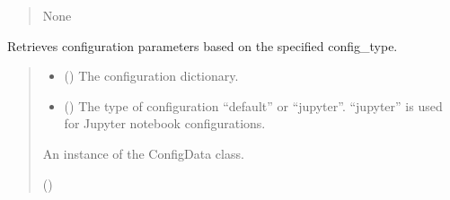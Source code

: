 \documentclass[a4paper,11pt,english,openany]{sphinxmanual}
\begin{document}
\begin{fulllineitems}
\begin{fulllineitems}
\begin{quote}
\begin{description}
\sphinxAtStartPar
None

\end{description}\end{quote}

\end{fulllineitems}


\begin{fulllineitems}
\label{\detokenize{api/spyice.utils.config_sort:id3}}
\pysigstartsignatures
{}
\pysigstopsignatures
\sphinxAtStartPar
Retrieves configuration parameters based on the specified config\_type.
\begin{quote}\begin{description}
\begin{itemize}
\item {} 
\sphinxAtStartPar
{} () \textendash{} The configuration dictionary.

\item {} 
\sphinxAtStartPar
{} () \textendash{} The type of configuration “default” or “jupyter”.
“jupyter” is used for Jupyter notebook configurations.

\end{itemize}

\sphinxAtStartPar
An instance of the ConfigData class.

\sphinxAtStartPar
{\hyperref[\detokenize{api/spyice.utils.config_sort:spyice.utils.config_sort.ConfigData}]{}} ()

\end{description}\end{quote}

\end{fulllineitems}


\end{fulllineitems}
\end{document}
